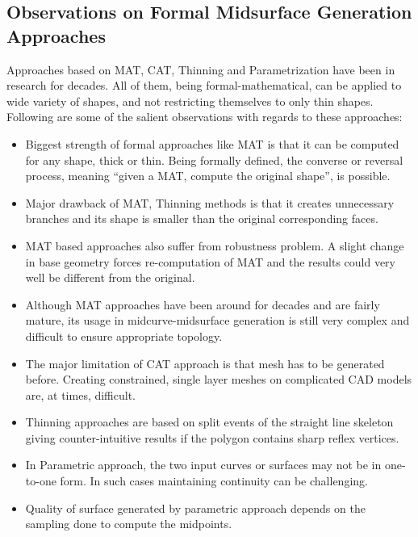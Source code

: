 

\subsection{Observations on Formal Midsurface Generation Approaches}\label{sec:survey:observationsformal}



Approaches based on MAT, CAT, Thinning and Parametrization have been in research for decades. All of them, being formal-mathematical, can be applied to wide variety of shapes, and not restricting themselves to only thin shapes. Following are some of the salient observations with regards to these approaches:


\begin{itemize}[noitemsep,topsep=2pt,parsep=2pt,partopsep=2pt]
	\item Biggest strength of formal approaches like MAT is that it can be computed for any shape, thick or thin. Being formally defined, the converse or reversal process, meaning ``given a MAT, compute the original shape'', is possible.
	\item Major drawback of MAT, Thinning methods is that it creates unnecessary branches and its shape is smaller than the original corresponding faces.
	\item  MAT based approaches also suffer from robustness problem. A slight change in base geometry forces re-computation of MAT and the results could very well be different from the original.
	\item Although MAT approaches have been around for decades and are fairly mature, its usage in midcurve-midsurface generation is still very complex and difficult to ensure appropriate topology.
	\item The major limitation of CAT approach is that mesh has to be generated before. Creating constrained, single layer meshes on complicated CAD models are, at times, difficult.
	\item Thinning approaches are based on split events of the straight line skeleton giving counter-intuitive results if the polygon contains sharp reflex vertices.
	\item In Parametric approach, the two input curves or surfaces may not be in one-to-one form. In such cases maintaining continuity can be challenging.
	\item Quality of surface generated by parametric approach depends on the sampling done to compute the midpoints.
\end{itemize}

